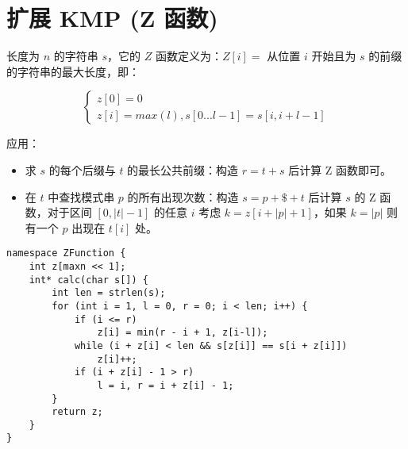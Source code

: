 \section{扩展 KMP (Z 函数)}

长度为 $n$ 的字符串 $s$，它的 $Z$ 函数定义为：$Z[i] =$  从位置 $i$ 开始且为 $s$ 的前缀的字符串的最大长度，即：

$$\begin{cases}z[0] = 0 \\z[i] = max(l), s[0...l-1] = s[i, i+l-1]\end{cases}$$

\par 应用：
\begin{itemize}
    \item 求 $s$ 的每个后缀与 $t$ 的最长公共前缀：构造 $r = t + s$ 后计算 Z 函数即可。
    \item 在 $t$ 中查找模式串 $p$ 的所有出现次数：构造 $s = p + \$ + t$ 后计算 $s$ 的 Z 函数，对于区间 $[0,|t|-1]$ 的任意 $i$ 考虑 $k=z[i+|p|+1]$，如果 $k = |p|$ 则有一个 $p$ 出现在 $t[i]$ 处。
\end{itemize}

\begin{verbatim}
namespace ZFunction {
    int z[maxn << 1];
    int* calc(char s[]) {
        int len = strlen(s);
        for (int i = 1, l = 0, r = 0; i < len; i++) {
            if (i <= r)
                z[i] = min(r - i + 1, z[i-l]);
            while (i + z[i] < len && s[z[i]] == s[i + z[i]])
                z[i]++;
            if (i + z[i] - 1 > r)
                l = i, r = i + z[i] - 1;
        }
        return z;
    }
}
\end{verbatim}